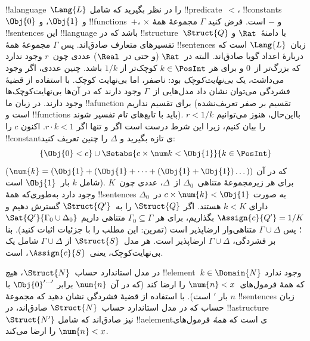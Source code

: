\documentclass[../../../include/open-logic-section]{subfiles}
\begin{document}
{\begin{ex}
!!a{language}~$\Lang{L}$ را در نظر بگیرید که شامل !!{predicate}~$<$،
!!{constant}s~$\Obj{0}$ و $\Obj{1}$، و !!{function}s~$+$، $\times$ و
$-$ است. فرض کنید $\Gamma$ مجموعهٔ همهٔ !!{sentence}s این
!!{language} باشد که در !!{structure}~$\Struct{Q}$ با دامنهٔ~$\Rat$ و
تفسیرهای متعارف صادق‌اند. پس $\Gamma$ مجموعهٔ همهٔ !!{sentence}s
زبان~$\Lang{L}$ است که دربارهٔ اعداد گویا صادق‌اند. البته در~$\Rat$
(و حتی در~$\Real$) عددی چون~$r$ وجود ندارد که بزرگ‌تر از~$0$ و برای هر
$k \in \PosInt$ کوچک‌تر از $1/k$ باشد. چنین عددی، اگر وجود می‌داشت،
یک \emph{بی‌نهایت‌کوچک} بود: ناصفر، اما بی‌نهایت کوچک. با استفاده از
قضیهٔ فشردگی می‌توان نشان داد مدل‌هایی از~$\Gamma$ وجود دارند که در
آن‌ها بی‌نهایت‌کوچک‌ها وجود دارند. در زبان ما !!a{function} برای تقسیم
نداریم (تقسیم بر صفر تعریف‌نشده است و !!{function}s باید با تابع‌های
تام تفسیر شوند). بااین‌حال، هنوز می‌توانیم $r < 1/k$ را بیان کنیم، زیرا
این شرط درست است اگر و تنها اگر $r \cdot k < 1$. اکنون $c$ را
!!{constant}ی تازه بگیرید و $\Delta$ را چنین تعریف کنید:
\[
\{\Obj{0} < c\}
\cup \Setabs{ c \times \num k < \Obj{1} }{k \in \PosInt}
\]
(که در آن $\num{k} = (\Obj{1} + (\Obj{1} + \dots + (\Obj{1} +
\Obj{1})\dots))$ شامل $k$ بار~$\Obj{1}$ است). برای هر زیرمجموعهٔ
متناهی~$\Delta_0$ از~$\Delta$، عددی چون~$K$ وجود دارد به‌طوری‌که همهٔ
!!{sentence}s به صورت $c \times \num{k} < \Obj{1}$ در~$\Delta_0$
دارای $k < K$ هستند. اگر $\Struct{Q}$ را به~$\Struct{Q'}$ گسترش دهیم
و $\Assign{c}{Q'} = 1/K$ بگذاریم، برای هر $\Gamma_0 \subseteq \Gamma$
متناهی داریم $\Sat{Q'}{\Gamma_0 \cup \Delta_0}$؛ پس
$\Gamma \cup \Delta$ متناهی‌وار ارضاپذیر است (تمرین: این مطلب را
با جزئیات اثبات کنید). بنا بر فشردگی، $\Gamma \cup \Delta$ ارضاپذیر
است. هر مدل~$\Struct{S}$ از $\Gamma \cup \Delta$ شامل یک
بی‌نهایت‌کوچک، یعنی~$\Assign{c}{S}$، است.
\end{ex}
}{}

\begin{prob}
در مدل استاندارد حساب~$\Struct{N}$، هیچ !!{element}~$k \in \Domain{N}$
وجود ندارد که همهٔ فرمول‌های~$\num{n} < x$ را ارضا کند (که در آن
$\num{n}$ برابر $\Obj{0}^{\prime\dots\prime}$ با $n$ بار $\prime$ است).
با استفاده از قضیهٔ فشردگی نشان دهید که مجموعهٔ !!{sentence}s زبان حساب
که در مدل استاندارد حساب~$\Struct{N}$ صادق‌اند، در
!!a{structure}~$\Struct{N'}$ نیز صادق‌اند که شامل !!a{element}ی است که
\emph{همهٔ} فرمول‌های $\num{n} < x$ را ارضا می‌کند.
\end{prob}
\tagendprob
\end{document}
